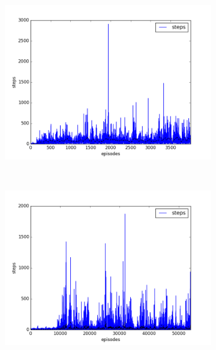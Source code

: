 \begin{figure}[t]
  \vspace*{-2cm}
  \begin{subfigure}[t]{\figscale\linewidth}
    \hspace*{-2.75cm}
    \includegraphics[width=1.5\textwidth]
    {../results/dqn_2vs1/steps.png}
    \label{fig:dqn-2vs1-steps}
  \end{subfigure}
  ~
  \begin{subfigure}[t]{\figscale\linewidth}
    \hspace*{-1.4cm}
    \includegraphics[width=1.5\textwidth]
    {../results/ddpg_2vs1/steps.png}
    \label{fig:ddpg-2vs1-steps}
  \end{subfigure}

\end{figure}
